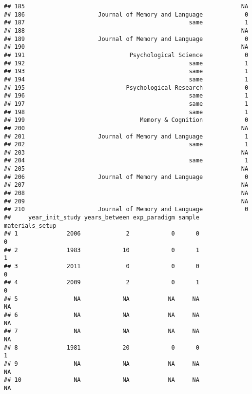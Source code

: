 \documentclass[
  english,
  man]{apa6}
\begin{document}
\begin{verbatim}
## 185                                                              NA
## 186                     Journal of Memory and Language            0
## 187                                               same            1
## 188                                                              NA
## 189                     Journal of Memory and Language            0
## 190                                                              NA
## 191                              Psychological Science            0
## 192                                               same            1
## 193                                               same            1
## 194                                               same            1
## 195                             Psychological Research            0
## 196                                               same            1
## 197                                               same            1
## 198                                               same            1
## 199                                 Memory & Cognition            0
## 200                                                              NA
## 201                     Journal of Memory and Language            1
## 202                                               same            1
## 203                                                              NA
## 204                                               same            1
## 205                                                              NA
## 206                     Journal of Memory and Language            0
## 207                                                              NA
## 208                                                              NA
## 209                                                              NA
## 210                     Journal of Memory and Language            0
##     year_init_study years_between exp_paradigm sample materials_setup
## 1              2006             2            0      0               0
## 2              1983            10            0      1               1
## 3              2011             0            0      0               0
## 4              2009             2            0      1               0
## 5                NA            NA           NA     NA              NA
## 6                NA            NA           NA     NA              NA
## 7                NA            NA           NA     NA              NA
## 8              1981            20            0      0               1
## 9                NA            NA           NA     NA              NA
## 10               NA            NA           NA     NA              NA

\end{verbatim}
\end{document}
